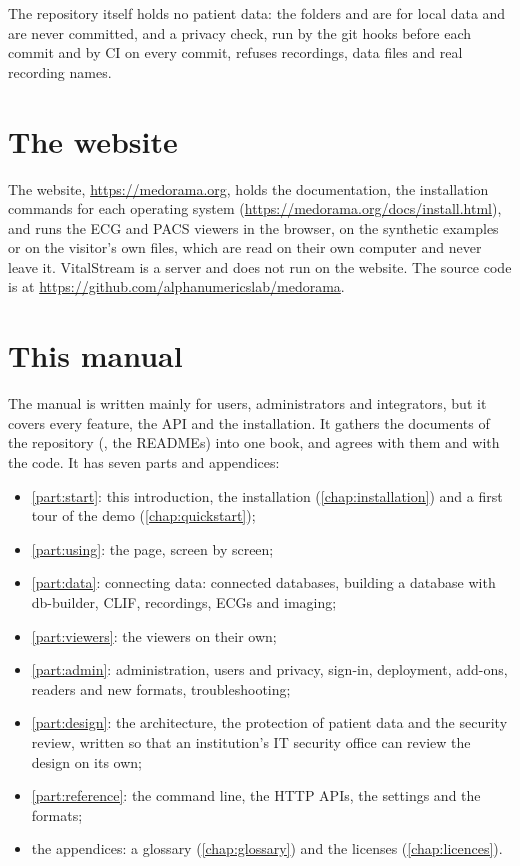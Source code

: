 The repository itself holds no patient data: the folders  and
 are for local data and are never committed, and a
privacy check, run by the git hooks before each commit and by CI on every commit, refuses
recordings, data files and real recording names.

\section{The website}
\label{sec:introduction-website}

The website, \url{https://medorama.org}, holds the documentation, the installation commands
for each operating system (\url{https://medorama.org/docs/install.html}), and
runs the ECG and PACS viewers in the browser, on the synthetic examples or on the visitor's
own files, which are read on their own computer and never leave it. VitalStream is a server
and does not run on the website. The source code is at
\url{https://github.com/alphanumericslab/medorama}.

\section{This manual}
\label{sec:introduction-manual}

The manual is written mainly for users, administrators and integrators, but it covers every
feature, the API and the installation. It gathers the documents of the repository
(, the READMEs) into one book, and agrees with them and with the code. It has seven
parts and appendices:
\begin{itemize}
\item \cref{part:start}: this introduction, the installation (\cref{chap:installation}) and a
  first tour of the demo (\cref{chap:quickstart});
\item \cref{part:using}: the page, screen by screen;
\item \cref{part:data}: connecting data: connected databases, building a database with
  db-builder, CLIF, recordings, ECGs and imaging;
\item \cref{part:viewers}: the viewers on their own;
\item \cref{part:admin}: administration, users and privacy, sign-in, deployment, add-ons,
  readers and new formats, troubleshooting;
\item \cref{part:design}: the architecture, the protection of patient data and the security
  review, written so that an institution's IT security office can review the design on its
  own;
\item \cref{part:reference}: the command line, the HTTP APIs, the settings and the formats;
\item the appendices: a glossary (\cref{chap:glossary}) and the licenses
  (\cref{chap:licences}).
\end{itemize}

